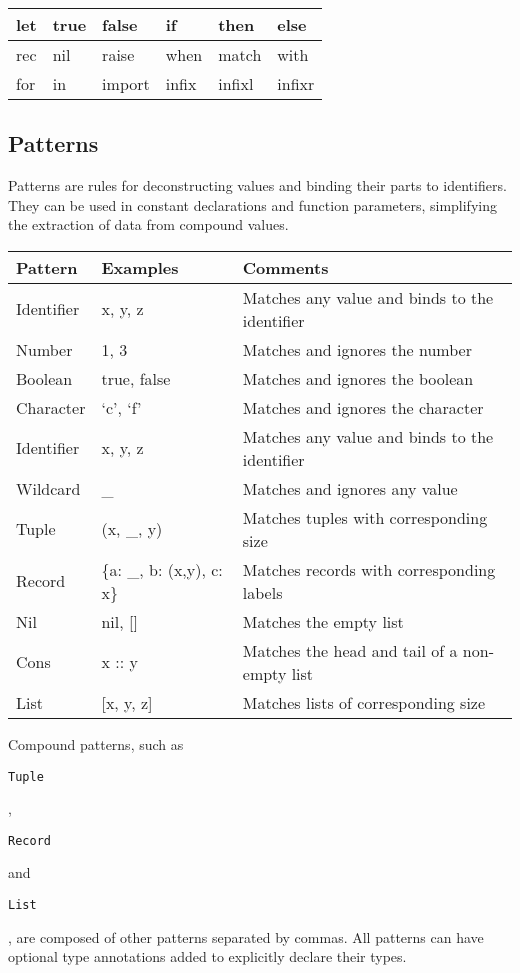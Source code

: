 \documentclass{article}
\def\code#1{\begin{footnotesize}\texttt{#1}\end{footnotesize}}
\begin{document}
\begin{tabular}{|l|l|l|l|l|l|}
  \hline
  let & true & false & if & then & else\\
  \hline
  rec & nil & raise & when & match & with\\
  \hline
  for & in & import & infix & infixl & infixr\\
  \hline
\end{tabular}

\subsection{Patterns}

Patterns are rules for deconstructing values and binding their parts to identifiers.
They can be used in constant declarations and function parameters, simplifying the extraction of data from compound values.

\medskip

\begin{tabular}{|l|l|l|}
  \hline
  \textbf{Pattern} & \textbf{Examples} & \textbf{Comments}\\
  \hline
  Identifier & x, y, z & Matches any value and binds to the identifier\\
  \hline
  Number & 1, 3 & Matches and ignores the number\\
  \hline
  Boolean & true, false & Matches and ignores the boolean\\
  \hline
  Character & `c', `f' & Matches and ignores the character\\
  \hline
  Identifier & x, y, z & Matches any value and binds to the identifier\\
  \hline
  Wildcard & _ & Matches and ignores any value\\
  \hline
  Tuple & (x, _, y) & Matches tuples with corresponding size\\
  \hline
  Record & \{a: _, b: (x,y), c: x\} & Matches records with corresponding labels\\
  \hline
  Nil & nil, [] & Matches the empty list\\
  \hline
  Cons & x :: y & Matches the head and tail of a non-empty list\\
  \hline
  List & [x, y, z] & Matches lists of corresponding size\\
  \hline
\end{tabular}

\medskip

Compound patterns, such as \code{Tuple}, \code{Record} and \code{List}, are composed of other patterns separated by commas.
All patterns can have optional type annotations added to explicitly declare their types.
\end{document}
